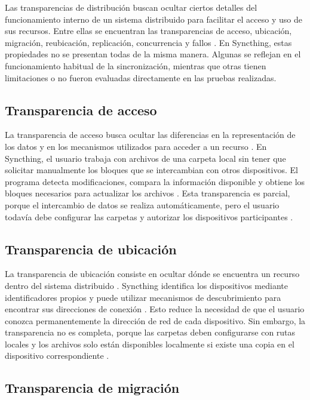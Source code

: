 \documentclass[12pt,a4paper]{article}
\begin{document}
Las transparencias de distribución buscan ocultar ciertos detalles del funcionamiento interno de un sistema distribuido para facilitar el acceso y uso de sus recursos. Entre ellas se encuentran las 
transparencias de acceso, ubicación, migración, reubicación, replicación, concurrencia y fallos \cite{vansteen2023}.
En Syncthing, estas propiedades no se presentan todas de la misma manera. Algunas se reflejan en el 
funcionamiento habitual de la sincronización, mientras que otras tienen limitaciones o no fueron evaluadas directamente en las pruebas realizadas.

\subsection{Transparencia de acceso}

La transparencia de acceso busca ocultar las diferencias en la representación de los datos y en los mecanismos utilizados para acceder a un recurso \cite{vansteen2023}.
En Syncthing, el usuario trabaja con archivos de una carpeta local sin tener que solicitar manualmente los bloques que se intercambian con otros dispositivos. El programa detecta modificaciones,
 compara la información disponible y obtiene los bloques necesarios para actualizar los archivos \cite{syncthingSyncing}.
Esta transparencia es parcial, porque el intercambio de datos se realiza automáticamente, pero el usuario todavía debe configurar las carpetas y autorizar los dispositivos participantes \cite{syncthingFAQ}.

\subsection{Transparencia de ubicación}

La transparencia de ubicación consiste en ocultar dónde se encuentra un recurso dentro del sistema distribuido \cite{vansteen2023}.
Syncthing identifica los dispositivos mediante identificadores propios y puede utilizar mecanismos de descubrimiento para encontrar sus direcciones de conexión \cite{syncthingDiscovery}. 
Esto reduce la necesidad de que el usuario conozca permanentemente la dirección de red de cada dispositivo.
Sin embargo, la transparencia no es completa, porque las carpetas deben configurarse con rutas locales y los archivos solo están disponibles localmente si existe una copia en el dispositivo correspondiente \cite{syncthingFAQ}.

\subsection{Transparencia de migración}
\end{document}
